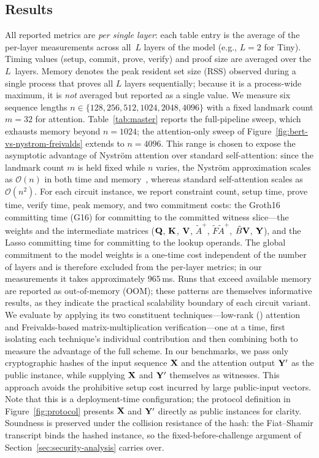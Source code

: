 \documentclass[runningheads]{llncs}
\begin{document}
\subsection{Results}
\label{subsec:pipeline-costs}
All reported metrics are \emph{per single layer}: each table entry is the average of the per-layer measurements across all~$L$ layers of the model (e.g., $L{=}2$ for Tiny). Timing values (setup, commit, prove, verify) and proof size are averaged over the $L$~layers. Memory denotes the peak resident set size (RSS) observed during a single process that proves all $L$ layers sequentially; because it is a process-wide maximum, it is \emph{not} averaged but reported as a single value. We measure six sequence lengths $n \in \{128, 256, 512, 1024, 2048, 4096\}$ with a fixed landmark count $m{=}32$ for \nystrom attention. Table~\ref{tab:master} reports the full-pipeline sweep, which exhausts memory beyond $n{=}1024$; the attention-only sweep of Figure~\ref{fig:bert-vs-nystrom-freivalds} extends to $n{=}4096$. This range is chosen to expose the asymptotic advantage of Nystr\"om attention over standard self-attention: since the landmark count $m$ is held fixed while $n$ varies, the Nystr\"om approximation scales as $\mathcal{O}(n)$ in both time and memory~\cite{Nystromformer}, whereas standard self-attention scales as $\mathcal{O}(n^2)$. For each circuit instance, we report constraint count, setup time, prove time, verify time, peak memory, and two commitment costs: the Groth16 committing time (G16) for committing to the committed witness slice---the weights and the intermediate matrices (${\mathbf{Q}}$, ${\mathbf{K}}$, ${\mathbf{V}}$, $\tilde{A}^{+}$, $\tilde{F}\tilde{A}^{+}$, $\tilde{B}{\mathbf{V}}$, ${\mathbf{Y}}$), and the Lasso committing time for committing to the lookup operands. The global commitment to the model weights is a one-time cost independent of the number of layers and is therefore excluded from the per-layer metrics; in our measurements it takes approximately $965$\,ms. Runs that exceed available memory are reported as out-of-memory (OOM); these patterns are themselves informative results, as they indicate the practical scalability boundary of each circuit variant. We evaluate \name by applying its two constituent techniques---low-rank (\nystrom) attention and Freivalds-based matrix-multiplication verification---one at a time, first isolating each technique's individual contribution and then combining both to measure the advantage of the full scheme.
In our benchmarks, we pass only cryptographic hashes of the input sequence ${\mathbf{X}}$ and the attention output ${\mathbf{Y}}'$ as the public instance, while supplying ${\mathbf{X}}$ and ${\mathbf{Y}}'$ themselves as witnesses. This approach avoids the prohibitive setup cost incurred by large public-input vectors. Note that this is a deployment-time configuration; the protocol definition in Figure~\ref{fig:protocol} presents ${\mathbf{X}}$ and ${\mathbf{Y}}'$ directly as public instances for clarity. Soundness is preserved under the collision resistance of the hash: the Fiat--Shamir transcript binds the hashed instance, so the fixed-before-challenge argument of Section~\ref{sec:security-analysis} carries over.
\end{document}
